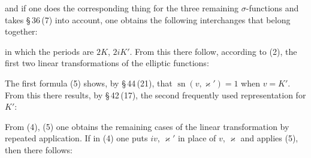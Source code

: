
and if one does the corresponding thing for the three remaining $\sigma$-functions and takes \S\,36\,(7) into account, one obtains the following interchanges that belong together:


in which the periods are $2K$, $2iK'$. From this there follow, according to (2), the first two linear transformations of the elliptic functions:



The first formula (5) shows, by \S\,44\,(21), that $\operatorname{sn}(v,\varkappa')=1$ when $v=K'$. From this there results, by \S\,42\,(17), the second frequently used representation for $K'$:


From (4), (5) one obtains the remaining cases of the linear transformation by repeated application. If in (4) one puts $iv$, $\varkappa'$ in place of $v$, $\varkappa$ and applies (5), then there follows:

